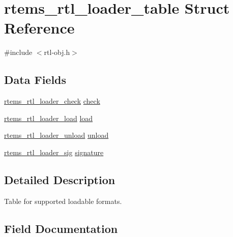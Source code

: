 \hypertarget{structrtems__rtl__loader__table}{}\section{rtems\+\_\+rtl\+\_\+loader\+\_\+table Struct Reference}
\label{structrtems__rtl__loader__table}


{\ttfamily \#include $<$rtl-\/obj.\+h$>$}

\subsection*{Data Fields}
\begin{DoxyCompactItemize}
\item 
\mbox{\hyperlink{rtl-obj_8h_ae65589434f7dfc4ab547022bef414e04}{rtems\+\_\+rtl\+\_\+loader\+\_\+check}} \mbox{\hyperlink{structrtems__rtl__loader__table_ac3213b5b389449084c07ad4229a2f65c}{check}}
\item 
\mbox{\hyperlink{rtl-obj_8h_a6d119678fa2e324376060e8b09ea56cf}{rtems\+\_\+rtl\+\_\+loader\+\_\+load}} \mbox{\hyperlink{structrtems__rtl__loader__table_a4261c0025f78e6a0593987c4af80a038}{load}}
\item 
\mbox{\hyperlink{rtl-obj_8h_afacdc84b4af0a65a15b4ef38ebef6ab0}{rtems\+\_\+rtl\+\_\+loader\+\_\+unload}} \mbox{\hyperlink{structrtems__rtl__loader__table_aae9690746d567cef6da822c244db8fb8}{unload}}
\item 
\mbox{\hyperlink{rtl-obj_8h_a31673e6af5ca5b1e8ccb074cfac376ba}{rtems\+\_\+rtl\+\_\+loader\+\_\+sig}} \mbox{\hyperlink{structrtems__rtl__loader__table_aa7edd550b8c7d1d6981bf9aeda5cceb9}{signature}}
\end{DoxyCompactItemize}


\subsection{Detailed Description}
Table for supported loadable formats. 

\subsection{Field Documentation}
\mbox{\label{structrtems__rtl__loader__table_ac3213b5b389449084c07ad4229a2f65c}} 
